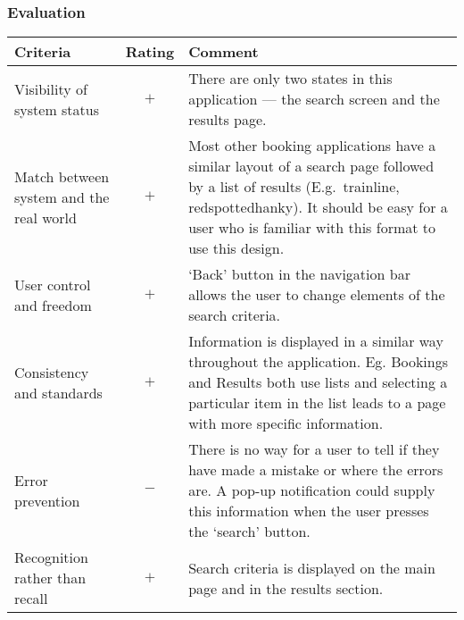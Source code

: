 
\subsubsection{Evaluation}

\begin{center}
	\renewcommand{\arraystretch}{2}
	\begin{longtable}{p{} c p{}}
		\toprule
		\textbf{Criteria} & \textbf{Rating} & \textbf{Comment}\\
		\midrule
		Visibility of system status & $+$ & There are only two states in this
		application --- the search screen and the results page.\\

		Match between system and the real world & $+$ & Most other booking
		applications have a similar layout of a search page followed by a list
		of results (E.g.\ trainline, redspottedhanky). It should be easy for a
		user who is familiar with this format to use this design.\\

		User control and freedom & $+$ & `Back' button in the navigation bar
		allows the user to change elements of the search criteria.\\

		Consistency and standards & $+$ & Information is displayed in a similar
		way throughout the application. Eg.  Bookings and Results both use
		lists and selecting a particular item in the list leads to a page with
		more specific information.\\

		Error prevention & $-$ & There is no way for a user to tell if they
		have made a mistake or where the errors are. A pop-up notification
		could supply this information when the user presses the `search'
		button.\\

		Recognition rather than recall & $+$ & Search criteria is displayed on
		the main page and in the results section.\\


\end{longtable}
\end{center}
